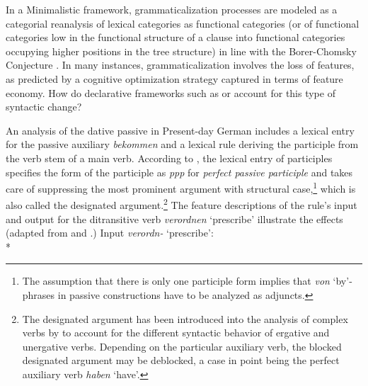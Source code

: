 \documentclass[output=paper
	        ,collection
	        ,collectionchapter
 	        ,biblatex
                ,babelshorthands
                ,newtxmath
                ,draftmode
                ,colorlinks, citecolor=brown
]{./langsci/langscibook}
\begin{document}
In a Minimalistic framework, grammaticalization processes are modeled as a categorial reanalysis of lexical categories as functional categories (or of functional categories low in the functional structure of a clause into functional categories occupying higher positions in the tree structure) in line with the Borer-Chomsky Conjecture \citep[17]{RobRou2003}. In many instances, grammaticalization involves the loss of features, as predicted by a cognitive optimization strategy captured in terms of feature economy. How do declarative frameworks such as \lfg or \hpsg account for this type of syntactic change? 

An \hpsg analysis of the dative passive in Present-day German includes a lexical entry for the passive auxiliary \textit{bekommen} and a lexical rule deriving the participle from the verb stem of a main verb. According to \cite[288]{mueller2018}, the lexical entry of participles specifies the form of the participle as \textit{ppp} for \textit{perfect passive participle} and takes care of suppressing the most prominent argument with structural case,\footnote{The assumption that there is only one participle form implies that \textit{von} `by'-phrases in passive constructions have to be analyzed as adjuncts.} which is also called the designated argument.\footnote{The designated argument has been introduced into the analysis of complex verbs by \cite{haider1986} to account for the different syntactic behavior of ergative and unergative verbs. Depending on the particular auxiliary verb, the blocked designated argument may be deblocked, a case in point being the perfect auxiliary verb \textit{haben} `have'.} The feature descriptions of the rule's input and output for the ditransitive verb \textit{verordnen} `prescribe' illustrate the effects (adapted from \cite[149]{mueller2002} and \cite[285]{mueller2018}.)
\ea 
\label{verordnen-active}
Input \textit{verordn-} `prescribe': \\*
\z 
\end{document}
